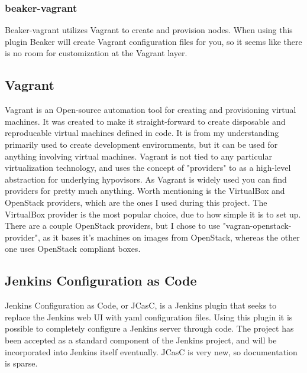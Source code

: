 \subsubsection{beaker-vagrant}

Beaker-vagrant utilizes Vagrant to create and provision nodes. When using this plugin Beaker will create Vagrant configuration files for you, so it seems like there is no room for customization at the Vagrant layer.

\subsection{Vagrant}

Vagrant is an Open-source automation tool for creating and provisioning virtual machines. It was created to make it straight-forward to create disposable and reproducable virtual machines defined in code. It is from my understanding primarily used to create development envirornments, but it can be used for anything involving virtual machines. Vagrant is not tied to any particular virtualization technology, and uses the concept of "providers" to as a high-level abstraction for underlying hypovisors. As Vagrant is widely used you can find providers for pretty much anything. Worth mentioning is the VirtualBox and OpenStack providers, which are the ones I used during this project. The VirtualBox provider is the most popular choice, due to how simple it is to set up. There are a couple OpenStack providers, but I chose to use "vagran-openstack-provider", as it bases it's machines on images from OpenStack, whereas the other one uses OpenStack compliant boxes.

\subsection{Jenkins Configuration as Code}

Jenkins Configuration as Code, or JCasC, is a Jenkins plugin that seeks to replace the Jenkins web UI with yaml configuration files. Using this plugin it is possible to completely configure a Jenkins server through code. The project has been accepted as a standard component of the Jenkins project, and will be incorporated into Jenkins itself eventually. JCasC is very new, so documentation is sparse.


